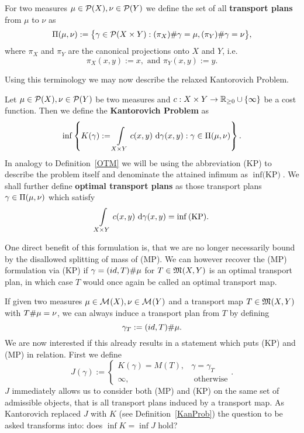 \begin{definition}\label{TransPlans}
	For two measures $\mu \in \PM{X}, \nu \in \PM{Y}$ we define the set of all \textbf{transport plans} from $\mu$ to $\nu$ as
	\[ \TP{\mu}{\nu} := \big\{ \gamma \in \PM{X \times Y} : \push[(\pi_X)]{\gamma} = \mu, \push[(\pi_Y)]{\gamma} = \nu \big\}, \]
	where $\pi_X$ and $\pi_Y$ are the canonical projections onto $X$ and $Y$, i.e.
	\[ \pi_X(x, y) := x, \text{ and } \pi_Y(x, y) := y. \]
\end{definition}

Using this terminology we may now describe the relaxed Kantorovich Problem.

\begin{definition}\label{KanProb}
	Let $\mu \in \PM{X}, \nu \in \PM{Y}$ be two measures and $\map[c]{X \times Y}{\RZero \cup \{\infty\}}$ be a cost function. Then we define the \textbf{Kantorovich Problem} as
	\begin{equation}\label{KP}
		\inf \left\{ K(\gamma) := \int\limits_{X \times Y} c(x, y)~\Dx[x, y]{\gamma} : \gamma \in \TP{\mu}{\nu} \right\}.
	\end{equation}
	In analogy to Definition~\ref{OTM} we will be using the abbreviation (KP) to describe the problem itself and denominate the attained infimum as $\inf \text{(KP)}$. We shall further define \textbf{optimal transport plans} as those transport plans $\gamma \in \TP{\mu}{\nu}$ which satisfy
	\[ \int\limits_{X \times Y} c(x, y)~\Dx[x, y]{\gamma} = \inf \text{(KP)}. \]
\end{definition}

One direct benefit of this formulation is, that we are no longer necessarily bound by the disallowed splitting of mass of (MP). We can however recover the (MP) formulation via (KP) if $\gamma = \push[(id, T)]{\mu}$ for $T \in \MF{X}{Y}$ is an optimal transport plan, in which case $T$ would once again be called an optimal transport map.

If given two measures $\mu \in \M{X}, \nu \in \M{Y}$ and a transport map $T \in \MF{X}{Y}$ with $\push{\mu} = \nu$, we can always induce a transport plan from $T$ by defining
\begin{equation}\label{IndPlan}
	\gamma_T := \push[(id, T)]{\mu}.
\end{equation}
We are now interested if this already results in a statement which puts (KP) and (MP) in relation. First we define
\[ J(\gamma) := 
	\begin{cases}
		K(\gamma) = M(T), & \gamma = \gamma_T \\
		\infty, & \text{ otherwise}
	\end{cases}. \]
$J$ immediately allows us to consider both (MP) and (KP) on the same set of admissible objects, that is all transport plans induced by a transport map. As Kantorovich replaced $J$ with $K$ (see Definition~\ref{KanProb}) the question to be asked transforms into: does $\inf K = \inf J$ hold?

